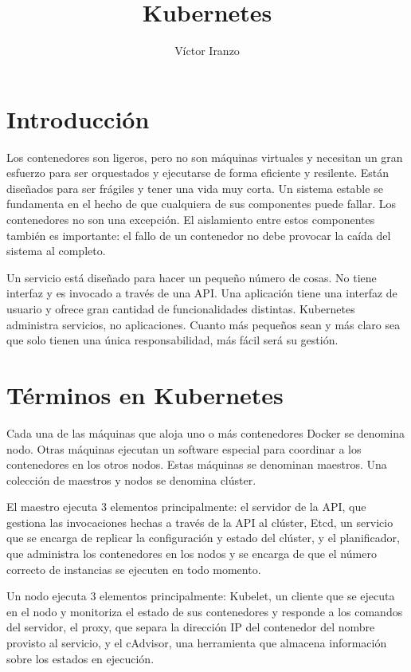 \documentclass[11pt,a4paper]{article}
\author{Víctor Iranzo}
\title{Kubernetes}
\begin{document}
\maketitle

\section{Introducción}

Los contenedores son ligeros, pero no son máquinas virtuales y necesitan un gran esfuerzo para ser orquestados y ejecutarse de forma eficiente y resilente. Están diseñados para ser frágiles y tener una vida muy corta. Un sistema estable se fundamenta en el hecho de que cualquiera de sus componentes puede fallar. Los contenedores no son una excepción. El aislamiento entre estos componentes también es importante: el fallo de un contenedor no debe provocar la caída del sistema al completo.

Un servicio está diseñado para hacer un pequeño número de cosas. No tiene interfaz y es invocado a través de una API. Una aplicación tiene una interfaz de usuario y ofrece gran cantidad de funcionalidades distintas. Kubernetes administra servicios, no aplicaciones. Cuanto más pequeños sean y más claro sea que solo tienen una única responsabilidad, más fácil será su gestión.

\section{Términos en Kubernetes}

Cada una de las máquinas que aloja uno o más contenedores Docker se denomina nodo. Otras máquinas ejecutan un software especial para coordinar a los contenedores en los otros nodos. Estas máquinas se denominan maestros. Una colección de maestros y nodos se denomina clúster.

El maestro ejecuta 3 elementos principalmente: el servidor de la API, que gestiona las invocaciones hechas a través de la API al clúster, Etcd, un servicio que se encarga de replicar la configuración y estado del clúster, y el planificador, que administra los contenedores en los nodos y se encarga de que el número correcto de instancias se ejecuten en todo momento.

Un nodo ejecuta 3 elementos principalmente: Kubelet, un cliente que se ejecuta en el nodo y monitoriza el estado de sus contenedores y responde a los comandos del servidor, el proxy, que separa la dirección IP del contenedor del nombre provisto al servicio, y el cAdvisor, una herramienta que almacena información sobre los estados en ejecución.
\end{document}
